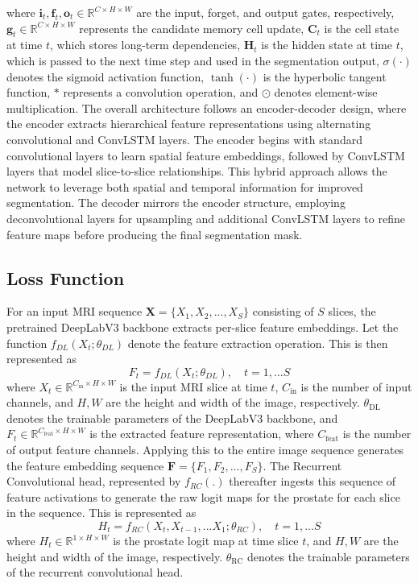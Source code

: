 \documentclass[journal]{IEEEtran}
\begin{document}
where \( \mathbf{i}_t, \mathbf{f}_t, \mathbf{o}_t \in \mathbb{R}^{C \times H \times W} \) are the input, forget, and output gates, respectively, \( \mathbf{g}_t \in \mathbb{R}^{C \times H \times W} \) represents the candidate memory cell update, \( \mathbf{C}_t \) is the cell state at time \( t \), which stores long-term dependencies, \( \mathbf{H}_t \) is the hidden state at time \( t \), which is passed to the next time step and used in the segmentation output, \( \sigma(\cdot) \) denotes the sigmoid activation function, \( \tanh(\cdot) \) is the hyperbolic tangent function, \( * \) represents a convolution operation, and \( \odot \) denotes element-wise multiplication.
The overall architecture follows an encoder-decoder design, where the encoder extracts hierarchical feature representations using alternating convolutional and ConvLSTM layers. The encoder begins with standard convolutional layers to learn spatial feature embeddings, followed by ConvLSTM layers that model slice-to-slice relationships. This hybrid approach allows the network to leverage both spatial and temporal information for improved segmentation. The decoder mirrors the encoder structure, employing deconvolutional layers for upsampling and additional ConvLSTM layers to refine feature maps before producing the final segmentation mask.

\subsection{Loss Function}
For an input MRI sequence \( \mathbf{X} = \{X_1, X_2, ..., X_S\} \) consisting of \( S \) slices, the pretrained DeepLabV3 backbone extracts per-slice feature embeddings. Let the function \(f_{DL}(X_t;\theta_{DL})\) denote the feature extraction operation. This is then represented as 
\begin{equation}
    F_{t} = f_{DL}(X_t;\theta_{DL}), \quad t=1,...S
    \label{eq:feat_extraction}
\end{equation}
where \( X_t \in \mathbb{R}^{C_{\text{in}} \times H \times W} \) is the input MRI slice at time \( t \), \( C_{\text{in}} \) is the number of input channels, and \( H, W \) are the height and width of the image, respectively. \(\theta_{\text{DL}}\) denotes the trainable parameters of the DeepLabV3 backbone, and \( F_t \in \mathbb{R}^{C_{\text{feat}} \times H \times W} \) is the extracted feature representation, where \( C_{\text{feat}} \) is the number of output feature channels. Applying this to the entire image sequence generates the feature embedding sequence \( \mathbf{F}=\{F_1, F_2, ..., F_S\}\). The Recurrent Convolutional head, represented by \(f_{RC}(.)\) thereafter ingests this sequence of feature activations to generate the raw logit maps for the prostate for each slice in the sequence. This is represented as 
\begin{equation}
    H_{t} = f_{RC}(X_t,X_{t-1},...X_{1};\theta_{RC}), \quad t=1,...S
    \label{eq:convlstm}
\end{equation}
where \( H_t \in \mathbb{R}^{1 \times H \times W} \) is the prostate logit map at time slice \( t \), and \( H, W \) are the height and width of the image, respectively. \(\theta_{\text{RC}}\) denotes the trainable parameters of the recurrent convolutional head.
\end{document}
